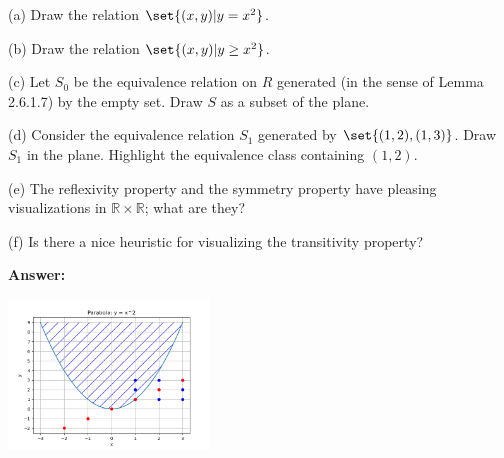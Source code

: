 \documentclass{article}
\newcommand{\Rational}{\mathbb{R}}
\newcommand{\vsp}[0]{\vspace*{10pt}\par}
\newcommand{\ans}[0]{\vsp\textbf{Answer: }\vsp}
\newenvironment{python}
  {\VerbatimEnvironment
   \begin{verbatim}}
  {\end{verbatim}}
\newenvironment{result}
  {\VerbatimEnvironment
   \begin{verbatim}}
  {\end{verbatim}}
\begin{document}
(a) Draw the relation $\set{(x,y)|y=x^2}$.

(b) Draw the relation $\set{(x,y)|y \ge x^2}$.

(c) Let $S_0$ be the equivalence relation on $R$ generated (in the sense of
Lemma 2.6.1.7) by the empty set. Draw $S$ as a subset of the plane.

(d) Consider the equivalence relation $S_1$ generated by $\set{(1,2),(1,3)}$.
Draw $S_1$ in the plane. Highlight the equivalence class containing $(1,2)$.

(e) The reflexivity property and the symmetry property have pleasing
visualizations in $\Rational \times \Rational$; what are they?

(f) Is there a nice heuristic for visualizing the transitivity property?

\ans

\begin{center}
\includegraphics[width=0.4\textwidth]{img/parabola.png}
\end{center}
\end{document}

